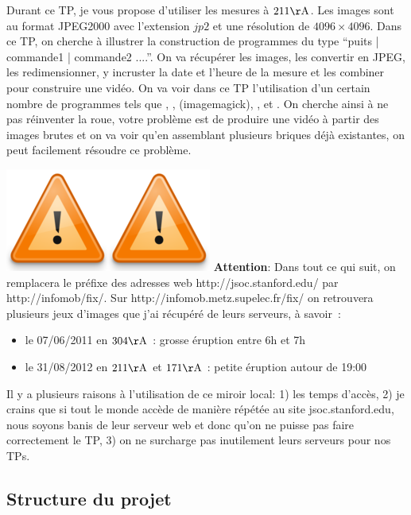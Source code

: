 Durant ce TP, je vous propose d'utiliser les mesures à $211 \si{\AA}$. Les images sont au format JPEG2000 avec l'extension $jp2$ et une résolution de $4096 \times 4096$. Dans ce TP, on cherche à illustrer la construction de programmes du type ``puits | commande1 | commande2 ....''. On va récupérer les images, les convertir en JPEG, les redimensionner, y incruster la date et l'heure de la mesure et les combiner pour construire une vidéo. On va voir dans ce TP l'utilisation d'un certain nombre de programmes tels que \bashcmd, \wget, \convert (imagemagick), \gawk, \sed et \ffmpeg. On cherche ainsi à ne pas réinventer la roue, votre problème est de produire une vidéo à partir des images brutes et on va voir qu'en assemblant plusieurs briques déjà existantes, on peut facilement résoudre ce problème.

\begin{center}
\colorbox{lblue}{\begin{minipage}{\linewidth}
\includegraphics[width=0.05\columnwidth]{Figs/warning.png}\includegraphics[width=0.05\columnwidth]{Figs/warning.png}
\textbf{Attention}: Dans tout ce qui suit, on remplacera le préfixe des adresses web http://jsoc.stanford.edu/ par http://infomob/fix/. Sur http://infomob.metz.supelec.fr/fix/ on retrouvera plusieurs jeux d'images que j'ai récupéré de leurs serveurs, à savoir~:
\begin{itemize}
\item le 07/06/2011 en $304\si{\AA}$ : grosse éruption entre 6h et 7h
\item le 31/08/2012 en $211\si{\AA}$ et $171\si{\AA}$ : petite éruption autour de 19:00
\end{itemize}
Il y a plusieurs raisons à l'utilisation de ce miroir local: 1) les temps d'accès, 2) je crains que si tout le monde accède de manière répétée au site jsoc.stanford.edu, nous soyons banis de leur serveur web et donc qu'on ne puisse pas faire correctement le TP, 3) on ne surcharge pas inutilement leurs serveurs pour nos TPs.
\end{minipage}}
\end{center}


\subsection{Structure du projet}

